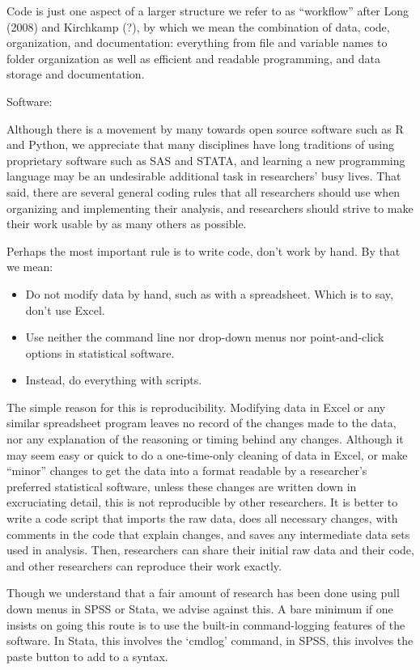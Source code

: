 \documentclass[12pt] {article}
\begin{document}
Code is just one aspect of a larger structure we refer to as
``workflow'' after Long (2008) and Kirchkamp (?), by which we mean the
combination of data, code, organization, and documentation: everything
from file and variable names to folder organization as well as efficient
and readable programming, and data storage and documentation.

Software:

Although there is a movement by many towards open source software such
as R and Python, we appreciate that many disciplines have long
traditions of using proprietary software such as SAS and STATA, and
learning a new programming language may be an undesirable additional
task in researchers' busy lives. That said, there are several general
coding rules that all researchers should use when organizing and
implementing their analysis, and researchers should strive to make their
work usable by as many others as possible.

Perhaps the most important rule is to write code, don't work by hand. By
that we mean:

\begin{itemize}
\item
  Do not modify data by hand, such as with a spreadsheet. Which is to
  say, don't use Excel.
\item
  Use neither the command line nor drop-down menus nor point-and-click
  options in statistical software.
\item
  Instead, do everything with scripts.
\end{itemize}

The simple reason for this is reproducibility. Modifying data in Excel
or any similar spreadsheet program leaves no record of the changes made
to the data, nor any explanation of the reasoning or timing behind any
changes. Although it may seem easy or quick to do a one-time-only
cleaning of data in Excel, or make ``minor'' changes to get the data
into a format readable by a researcher's preferred statistical software,
unless these changes are written down in excruciating detail, this is
not reproducible by other researchers. It is better to write a code
script that imports the raw data, does all necessary changes, with
comments in the code that explain changes, and saves any intermediate
data sets used in analysis. Then, researchers can share their initial
raw data and their code, and other researchers can reproduce their work
exactly.

Though we understand that a fair amount of research has been done using
pull down menus in SPSS or Stata, we advise against this. A bare minimum
if one insists on going this route is to use the built-in
command-logging features of the software. In Stata, this involves the
`cmdlog' command, in SPSS, this involves the paste button to add to a
syntax.
\end{document}
